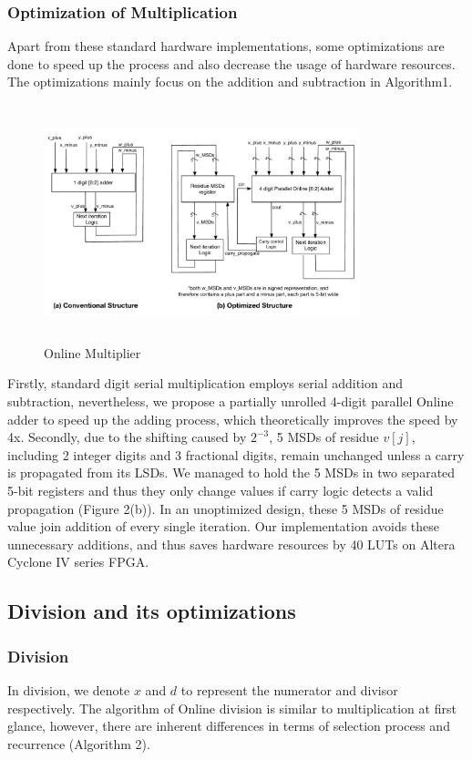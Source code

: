 \documentclass{sig-alternate}
\begin{document}
	\subsubsection{Optimization of Multiplication}
	Apart from these standard hardware implementations, some optimizations are done to speed up the process and also decrease the usage of hardware resources. The optimizations mainly focus on the addition and subtraction in Algorithm1.
	\begin{figure} [ht]
		\centering
		\includegraphics[height=2.7in,width=3.6in]{dividing_upper_block}
		\caption{Online Multiplier}
	\end{figure}
	\vspace{-10pt}
	
	Firstly, standard digit serial multiplication employs serial addition and subtraction, nevertheless, we propose a partially unrolled 4-digit parallel Online adder to speed up the adding process, which theoretically improves the speed by 4x. Secondly, due to the shifting caused by $2^{-3}$, 5 MSDs of residue $v[j]$, including 2 integer digits and 3 fractional digits, remain unchanged unless a carry is propagated from its LSDs. We managed to hold the 5 MSDs in two separated 5-bit registers and thus they only change values if carry logic detects a valid propagation (Figure 2(b)). In an unoptimized design, these 5 MSDs of residue value join addition of every single iteration. Our implementation avoids these unnecessary additions, and thus saves hardware resources by 40 LUTs on Altera Cyclone IV series FPGA.     
	
	\subsection{Division and its optimizations}
	\subsubsection{Division}
	In division, we denote $x$ and $d$ to represent the numerator and divisor respectively. The algorithm of Online division is similar to multiplication at first glance, however, there are inherent differences in terms of selection process and recurrence (Algorithm 2).
	
\end{document}
